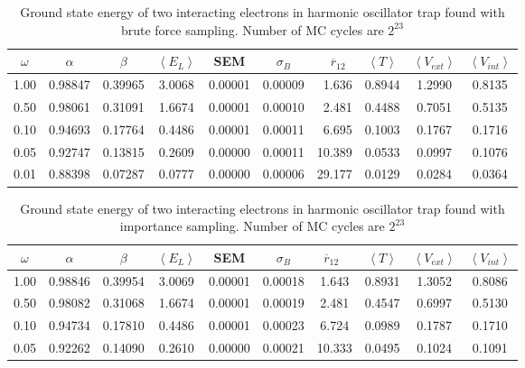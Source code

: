 \begin{table}[H]\caption{Ground state energy of two interacting electrons in harmonic oscillator trap found with brute force sampling. Number of MC cycles are $2^{23}$}\label{tab:ground_state_energy_brute_force_interaction}
\center
\begin{tabular}{c|cccccrccc}
$\omega$ & $\alpha$ & $\beta$ & $\left< E_L \right>$ & SEM & $\sigma_B$ &  $\overline{r}_{12} \,\,\,$ & $\left< T \right>$  & $\left< V_{ext}\right>$ & $\left<V_{int} \right>$  \\ \hline
1.00 & 0.98847 & 0.39965 & 3.0068 & 0.00001 & 0.00009 & 1.636 & 0.8944 & 1.2990 & 0.8135\\
0.50 & 0.98061 & 0.31091 & 1.6674 & 0.00001 & 0.00010 & 2.481 & 0.4488 & 0.7051 & 0.5135\\
0.10 & 0.94693 & 0.17764 & 0.4486 & 0.00001 & 0.00011 & 6.695 & 0.1003 & 0.1767 & 0.1716\\
0.05 & 0.92747 & 0.13815 & 0.2609 & 0.00000 & 0.00011 & 10.389 & 0.0533 & 0.0997 & 0.1076\\
0.01 & 0.88398 & 0.07287 & 0.0777 & 0.00000 & 0.00006 & 29.177 & 0.0129 & 0.0284 & 0.0364\\
\end{tabular}
\end{table}

\begin{table}[H]\caption{Ground state energy of two interacting electrons in harmonic oscillator trap found with importance sampling. Number of MC cycles are $2^{23}$}\label{tab:ground_state_energy_importance_interaction}
\center
\begin{tabular}{c|ccccccccc}
$\omega$ & $\alpha$ & $\beta$ & $\left< E_L \right>$ & SEM & $\sigma_B$ &  $\overline{r}_{12} \,\,\,$ & $\left< T \right>$  & $\left< V_{ext}\right>$ & $\left<V_{int} \right>$  \\ \hline
1.00 & 0.98846 & 0.39954 & 3.0069 & 0.00001 & 0.00018 & 1.643 & 0.8931 & 1.3052 & 0.8086\\
0.50& 0.98082 & 0.31068 & 1.6674 & 0.00001 & 0.00019 & 2.481 & 0.4547 & 0.6997 & 0.5130\\
0.10 & 0.94734 & 0.17810 & 0.4486 & 0.00001 & 0.00023 & 6.724 & 0.0989 & 0.1787 & 0.1710\\
0.05 & 0.92262 & 0.14090 & 0.2610 & 0.00000 & 0.00021 & 10.333 & 0.0495 & 0.1024 & 0.1091\\

\end{tabular}
\end{table}

